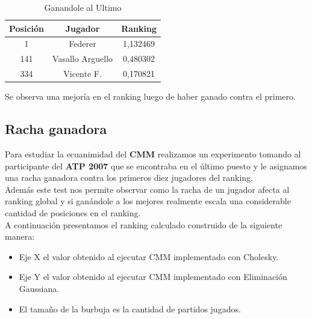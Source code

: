 \begin{table}[H]
\caption{Ganandole al Ultimo}
\centering
\begin{tabular}{c c c}
\hline \hline
    Posición & Jugador & Ranking \\ 
    \hline
    1 & Federer & 1,132469 \\ 
    141 & Vasallo Arguello & 0,480302 \\ 
    334 & Vicente F. & 0,170821 \\ 
    \hline
    \end{tabular}
\end{table}

\newline

Se observa una mejoría en el ranking luego de haber ganado contra el primero.
\\

\subsection{Racha ganadora}

Para estudiar la ecuanimidad del \textbf{CMM} realizamos un experimento tomando al participante del \textbf{ATP 2007} que se encontraba en el último puesto y le asignamos una racha ganadora contra los primeros diez jugadores del ranking. \\

Además este test nos permite observar como la racha de un jugador afecta al ranking global y si ganándole a los mejores realmente escala una considerable cantidad de posiciones en el ranking. \\

A continuación presentamos el ranking calculado construido de la siguiente manera: \\

\begin{itemize}
    \item Eje X el valor obtenido al ejecutar CMM implementado con Cholesky.
    \item Eje Y el valor obtenido al ejecutar CMM implementado con Eliminación Gaussiana.
    \item El tamaño de la burbuja es la cantidad de partidos jugados.
\end{itemize}

\\

